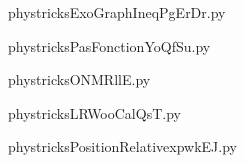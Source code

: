     

    \clearpage
    


    \newcommand{\CaptionFigExoGraphIneqPgErDr}{<+Type your caption here+>}
    \begin{center}
        
    \end{center}
    phystricksExoGraphIneqPgErDr.py

    

    \clearpage
    


    \newcommand{\CaptionFigPasFonctionYoQfSu}{<+Type your caption here+>}
    \begin{center}
        
    \end{center}
    phystricksPasFonctionYoQfSu.py

    

    \clearpage
    


    \newcommand{\CaptionFigONMRllE}{<+Type your caption here+>}
    \begin{center}
        
    \end{center}
    phystricksONMRllE.py

    

    \clearpage
    


    \newcommand{\CaptionFigLRWooCalQsT}{<+Type your caption here+>}
    \begin{center}
        
    \end{center}
    phystricksLRWooCalQsT.py

    

    \clearpage
    


    \newcommand{\CaptionFigPositionRelativexpwkEJ}{<+Type your caption here+>}
    \begin{center}
        
    \end{center}
    phystricksPositionRelativexpwkEJ.py

    

    \clearpage
    


